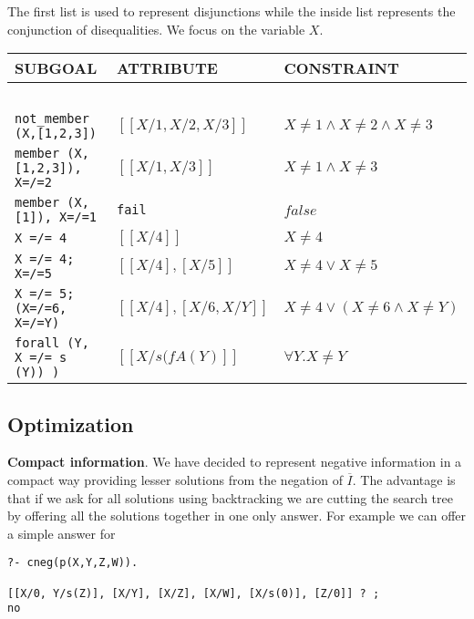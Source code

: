 \documentclass{llncs}
\begin{document}
The first list is used to represent disjunctions while
the inside list represents the conjunction of disequalities.
We focus on the variable $X$.

\begin{center}
\begin{small}
\begin{tabular}{lll}
SUBGOAL & ATTRIBUTE & CONSTRAINT \\
\hline\hline
\ \\
{\tt not\_member (X,[1,2,3])}   &  $[[X/1,X/2,X/3]]$  & $X \neq 1 \wedge X \neq 2 \wedge X \neq 3$\\
{\tt member (X,[1,2,3]), X=/=2} &  $[[X/1,X/3]]$       & $X \neq 1 \wedge X \neq 3$\\
{\tt member (X,[1]), X=/=1}     &  {\tt fail}          & $false$ \\
{\tt X =/= 4}                   & $[[X/4]]$            & $X \neq 4$ \\
{\tt X =/= 4; X=/=5}            & $[[X/4], [X/5]]$     & $X \neq 4 \vee X \neq 5$ \\
{\tt X =/= 5; (X=/=6, X=/=Y)}   & $[[X/4],[X/6, X/Y]]$ & $X \neq 4 \vee (X \neq 6 \wedge X \neq Y)$\\
{\tt forall (Y, X =/= s (Y)) )}     & $[[X/s(fA(Y)]]$  & $\forall Y. X \neq Y$ \\
\end{tabular}
\end{small}
\end{center}




\subsection{Optimization}
\label{optimization}

\noindent
{\bf Compact information}. We have decided to represent negative
information in a compact way providing lesser solutions from the
negation of $\overline{I}$. The advantage is that if we ask
for all solutions using backtracking we are cutting the search tree by
offering all the solutions together in one only answer. For example we can
offer a simple answer for
\begin{verbatim}
?- cneg(p(X,Y,Z,W)).

[[X/0, Y/s(Z)], [X/Y], [X/Z], [X/W], [X/s(0)], [Z/0]] ? ;
no
\end{verbatim}
\end{document}
